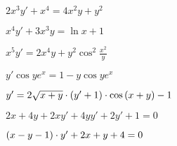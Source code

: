 \begin{multicols}{2}
\begin{enumtasks}
			\item \( 2x^3 y' + x^4 = 4x^2 y + y^2 \) 												%
			\item \( x^4 y' + 3x^3 y = \ln{x} + 1 \) 												%
			\item \( x^5 y' = 2x^4 y + y^2 \cos^2{\frac{x^2}{y}} \)									%
			\item \( y' \cos{ye^{x}} = 1 - y \cos{ye^{x}} \)										%
			\item \( y' = 2\sqrt{x + y} \cdot \left( y' + 1 \right) \cdot \cos{ \left( x + y \right) } - 1 \)		%
			\item \( 2x + 4y + 2xy' + 4yy' + 2y' + 1 = 0 \) 										%
			\item \( \left( x - y - 1 \right) \cdot y' + 2x + y + 4 = 0 \) 								%

		\end{enumtasks}
	\end{multicols}